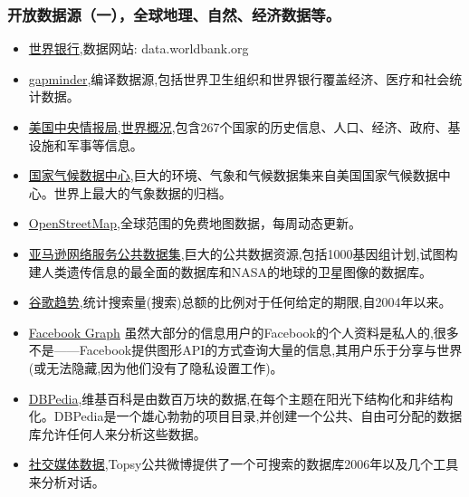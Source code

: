 \documentclass[letterpaper,10pt,english]{sphinxmanual}
\begin{document}
\subsubsection{开放数据源（一），全球地理、自然、经济数据等。}
\label{opendatasource:}\label{opendatasource:id2}\begin{itemize}
\item {} 
\href{http://www.worldbank.org.cn/}{世界银行},数据网站: data.worldbank.org

\item {} 
\href{http://www.gapminder.org/data/}{gapminder},编译数据源,包括世界卫生组织和世界银行覆盖经济、医疗和社会统计数据。

\item {} 
\href{https://www.cia.gov/library/publications/the-world-factbook/}{美国中央情报局,世界概况},包含267个国家的历史信息、人口、经济、政府、基设施和军事等信息。

\item {} 
\href{http://www.ncdc.noaa.gov/data-access/quick-links\#loc-clim}{国家气候数据中心},巨大的环境、气象和气候数据集来自美国国家气候数据中心。世界上最大的气象数据的归档。

\item {} 
\href{http://www.openstreetmap.org}{OpenStreetMap},全球范围的免费地图数据，每周动态更新。

\item {} 
\href{http://aws.amazon.com/datasets}{亚马逊网络服务公共数据集},巨大的公共数据资源,包括1000基因组计划,试图构建人类遗传信息的最全面的数据库和NASA的地球的卫星图像的数据库。

\item {} 
\href{http://www.google.com/trends/explore}{谷歌趋势},统计搜索量(搜索)总额的比例对于任何给定的期限,自2004年以来。

\item {} 
\href{https://developers.facebook.com/docs/graph-api}{Facebook Graph}
虽然大部分的信息用户的Facebook的个人资料是私人的,很多不是——Facebook提供图形API的方式查询大量的信息,其用户乐于分享与世界(或无法隐藏,因为他们没有了隐私设置工作)。

\item {} 
\href{http://wiki.dbpedia.org}{DBPedia},维基百科是由数百万块的数据,在每个主题在阳光下结构化和非结构化。DBPedia是一个雄心勃勃的项目目录,并创建一个公共、自由可分配的数据库允许任何人来分析这些数据。

\item {} 
\href{http://topsy.com}{社交媒体数据},Topsy公共微博提供了一个可搜索的数据库2006年以及几个工具来分析对话。


\end{itemize}
\end{document}
